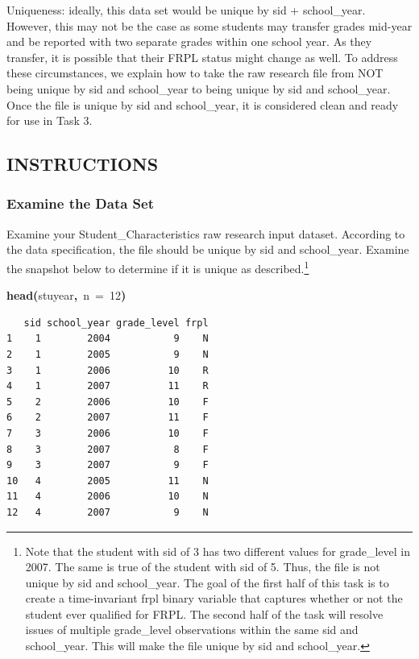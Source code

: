\documentclass[12pt]{article}
\makeatletter
\newcommand{\hlnumber}[1]{\textcolor[rgb]{0,0,0}{#1}}%
\newcommand{\hlfunctioncall}[1]{\textcolor[rgb]{0.501960784313725,0,0.329411764705882}{\textbf{#1}}}%
\newcommand{\hlkeyword}[1]{\textcolor[rgb]{0,0,0}{\textbf{#1}}}%
\newcommand{\hlargument}[1]{\textcolor[rgb]{0.690196078431373,0.250980392156863,0.0196078431372549}{#1}}%
\newcommand{\hlsymbol}[1]{\textcolor[rgb]{0,0,0}{#1}}%
\newenvironment{kframe}{%
 \def\FrameCommand##1{\hskip\@totalleftmargin \hskip-\fboxsep
 \colorbox{shadecolor}{##1}\hskip-\fboxsep
     \hskip-\linewidth \hskip-\@totalleftmargin \hskip\columnwidth}%
 \MakeFramed {\advance\hsize-\width
   \@totalleftmargin\z@ \linewidth\hsize
   \@setminipage}}%
 {\par\unskip\endMakeFramed}
\newenvironment{knitrout}{}{} %
\renewenvironment{knitrout}{\begin{footnotesize}}{\end{footnotesize}}
\makeatother
\begin{document}
Uniqueness: ideally, this data set would be unique by sid + school\_year. However, this may not be the case as some students may 
transfer grades mid-year and be reported with two separate grades within one school year.  As they transfer, it is possible that 
their FRPL status might change as well.  To address these circumstances, we explain how to take the raw research file from NOT 
being unique by sid and school\_year to being unique by sid and school\_year.  Once the file is unique by sid and school\_year, it is 
considered clean and ready for use in Task 3.


\subsection{INSTRUCTIONS}
\subsubsection{Examine the Data Set}
Examine your Student\_Characteristics raw research input dataset.  According to the data specification, the file should be 
unique by sid and school\_year.  Examine the snapshot below to determine if it is unique as described.\footnote{ Note that the student with sid of 3 has two 
different values for grade\_level in 2007. The same is true of the student with sid of 5.  Thus, the file is not unique by sid and school\_year.
The goal of the first half of this task is to create a time-invariant frpl binary  variable that captures whether or not the student ever qualified for FRPL. The second half of the task will resolve issues of multiple grade\_level observations within the same sid and school\_year.  This will make the file unique by sid and school\_year.}

\begin{knitrout}
\color{fgcolor}\begin{kframe}
\begin{flushleft}
\ttfamily\noindent
\hlfunctioncall{head}\hlkeyword{(}\hlsymbol{stuyear}\hlkeyword{,}{\ }\hlargument{n}{\ }\hlargument{=}{\ }\hlnumber{12}\hlkeyword{)}\mbox{}
\normalfont
\end{flushleft}
\begin{verbatim}
   sid school_year grade_level frpl
1    1        2004           9    N
2    1        2005           9    N
3    1        2006          10    R
4    1        2007          11    R
5    2        2006          10    F
6    2        2007          11    F
7    3        2006          10    F
8    3        2007           8    F
9    3        2007           9    F
10   4        2005          11    N
11   4        2006          10    N
12   4        2007           9    N
\end{verbatim}
\end{kframe}
\end{knitrout}
\end{document}
